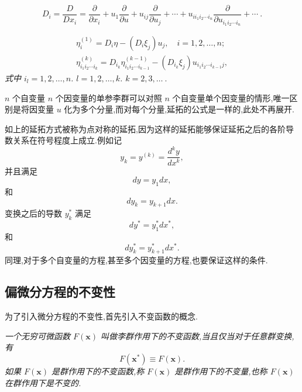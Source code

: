 \begin{definition}[全导数算子]
\emph{\begin{equation*}
D_i=\frac{D}{Dx_i}=\frac{\partial}{\partial x_i}+u_1\frac{\partial}{\partial u}+u_{ij}\frac{\partial}{\partial u_j}+\cdots+u_{ii_1i_2\cdots i_n}\frac{\partial}{\partial u_{i_1i_2\cdots i_n}}+\cdots~.
\end{equation*}}
\end{definition}

\begin{theorem}
\emph{\begin{equation*}
\begin{aligned}
\eta_i^{(1)}=D_i\eta-(D_i\xi_j)u_j,\quad i=1,2,\ldots,n ;\\
\eta^{(k)}_{i_1i_2\cdots i_k} = D_{i_k}\eta_{i_1i_2\cdots i_{k-1}}^{(k-1)}-(D_{i_k}\xi_j)u_{i_1i_2\cdots i_{k-1}j},
\end{aligned}
\end{equation*}
式中 $i_l=1,2,\ldots,n$. $l=1,2,\ldots,k$. $k=2,3,\ldots~.$}
\end{theorem}

$n$ 个自变量 $n$ 个因变量的单参李群可以对照 $n$ 个自变量单个因变量的情形,唯一区别是将因变量 $u$ 化为多个分量,而对每个分量,延拓的公式是一样的,此处不再展开.

如上的延拓方式被称为点对称的延拓,因为这样的延拓能够保证延拓之后的各阶导数关系在符号程度上成立.例如记
\begin{equation*}
	y_k=y^{(k)}=\frac{d^ky}{dx^k},
\end{equation*}
并且满足
\begin{equation*}
	dy=y_1dx,
\end{equation*}
和
\begin{equation*}
	dy_k=y_{k+1}dx.
\end{equation*}
变换之后的导数 $y_k^*$ 满足
\begin{equation*}
	dy^*=y^*_1dx^*,
\end{equation*}
和
\begin{equation*}
	dy_k^*=y^*_{k+1}dx^*.
\end{equation*}
同理,对于多个自变量的方程,甚至多个因变量的方程,也要保证这样的条件.

\subsection{偏微分方程的不变性}
为了引入微分方程的不变性,首先引入不变函数的概念.
\begin{definition}[不变函数]
	\emph{一个无穷可微函数 $F(\mathbf{x})$ 叫做李群作用下的不变函数,当且仅当对于任意群变换,有
	\begin{equation*}
		F(\mathbf{x^*})\equiv F(\mathbf{x}).
	\end{equation*}
如果 $F(\mathbf{x})$ 是群作用下的不变函数,称 $F(\mathbf{x})$ 是群作用下的不变量,也称 $F(\mathbf{x})$ 在群作用下是不变的.}
\end{definition}

